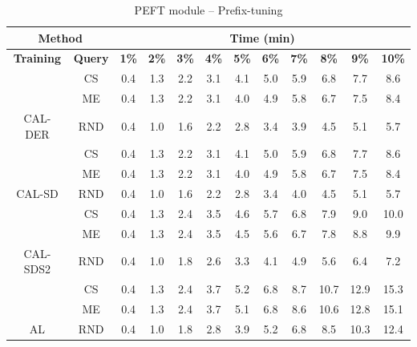 \begin{table}[htbp]
\begin{subtable}{\linewidth}
\begin{tabular}{c|c|cccccccccc}
\toprule
\multicolumn{2}{c|}{\textbf{Method}} & \multicolumn{10}{c}{\textbf{Time (min)}} \\
\midrule
\textbf{Training} & \textbf{Query} & \textbf{1\%} & \textbf{2\%} & \textbf{3\%} & \textbf{4\%} & \textbf{5\%} & \textbf{6\%} & \textbf{7\%} & \textbf{8\%} & \textbf{9\%} & \textbf{10\%}\\
\midrule
 & CS & 0.4 & 1.3 & 2.2 & 3.1 & 4.1 & 5.0 & 5.9 & 6.8 & 7.7 & 8.6\\

 & ME & 0.4 & 1.3 & 2.2 & 3.1 & 4.0 & 4.9 & 5.8 & 6.7 & 7.5 & 8.4\\

\multirow{-3}{*}{\raggedright\arraybackslash CAL-DER} & RND & 0.4 & 1.0 & 1.6 & 2.2 & 2.8 & 3.4 & 3.9 & 4.5 & 5.1 & 5.7\\
\midrule
 & CS & 0.4 & 1.3 & 2.2 & 3.1 & 4.1 & 5.0 & 5.9 & 6.8 & 7.7 & 8.6\\

 & ME & 0.4 & 1.3 & 2.2 & 3.1 & 4.0 & 4.9 & 5.8 & 6.7 & 7.5 & 8.4\\

\multirow{-3}{*}{\raggedright\arraybackslash CAL-SD} & RND & 0.4 & 1.0 & 1.6 & 2.2 & 2.8 & 3.4 & 4.0 & 4.5 & 5.1 & 5.7\\
\midrule
 & CS & 0.4 & 1.3 & 2.4 & 3.5 & 4.6 & 5.7 & 6.8 & 7.9 & 9.0 & 10.0\\

 & ME & 0.4 & 1.3 & 2.4 & 3.5 & 4.5 & 5.6 & 6.7 & 7.8 & 8.8 & 9.9\\

\multirow{-3}{*}{\raggedright\arraybackslash CAL-SDS2} & RND & 0.4 & 1.0 & 1.8 & 2.6 & 3.3 & 4.1 & 4.9 & 5.6 & 6.4 & 7.2\\
\midrule
 & CS & 0.4 & 1.3 & 2.4 & 3.7 & 5.2 & 6.8 & 8.7 & 10.7 & 12.9 & 15.3\\

 & ME & 0.4 & 1.3 & 2.4 & 3.7 & 5.1 & 6.8 & 8.6 & 10.6 & 12.8 & 15.1\\

\multirow{-3}{*}{\raggedright\arraybackslash AL} & RND & 0.4 & 1.0 & 1.8 & 2.8 & 3.9 & 5.2 & 6.8 & 8.5 & 10.3 & 12.4\\
\bottomrule
\end{tabular}
\end{subtable}
\vspace{1em}
\begin{subtable}{\linewidth}
\centering
\caption{PEFT module -- Prefix-tuning}


\end{subtable}
\end{table}
